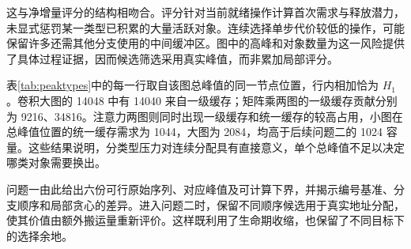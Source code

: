 这与净增量评分的结构相吻合。评分针对当前就绪操作计算首次需求与释放潜力，未显式惩罚某一类型已积累的大量活跃对象。连续选择单步代价较低的操作，可能保留许多还需其他分支使用的中间缓冲区。图中的高峰和对象数量为这一风险提供了具体过程证据，因而候选筛选采用真实峰值，而非累加局部评分。

\begin{table}[H]\centering\small
\caption{各选定序列总峰值发生位置的分类型组成}\label{tab:peaktypes}
\end{table}
表\ref{tab:peaktypes}中的每一行取自该图总峰值的同一节点位置，行内相加恰为 $H_1$。卷积大图的 14048 中有 14040 来自一级缓存；矩阵乘两图的一级缓存贡献分别为 9216、34816。注意力两图则同时出现一级缓存和统一缓存的较高占用，小图在总峰值位置的统一缓存需求为 1044，大图为 2084，均高于后续问题二的 1024 容量。这些结果说明，分类型压力对连续分配具有直接意义，单个总峰值不足以决定哪类对象需要换出。

问题一由此给出六份可行原始序列、对应峰值及可计算下界，并揭示编号基准、分支顺序和局部贪心的差异。进入问题二时，保留不同顺序候选用于真实地址分配，使其价值由额外搬运量重新评价。这样既利用了生命期收缩，也保留了不同目标下的选择余地。
